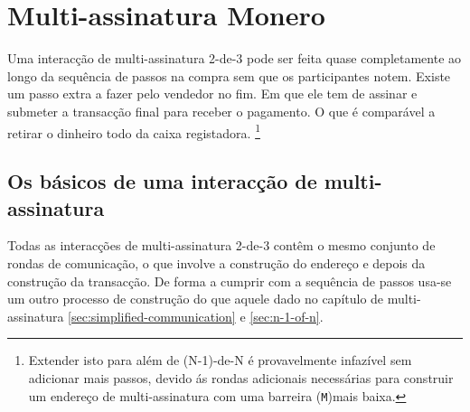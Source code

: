 \section{Multi-assinatura Monero}
\label{sec:escrowed-marketplace-seamless-multisig}

Uma interacção de multi-assinatura 2-de-3 pode ser feita quase completamente ao longo da sequência de passos na compra sem que os participantes notem. Existe um passo extra a fazer pelo vendedor no fim. Em que ele tem de assinar e submeter a transacção final para receber o pagamento. O que é comparável a retirar o dinheiro todo da caixa registadora.  
\footnote{Extender isto para além de (N-1)-de-N é provavelmente infazível sem adicionar mais passos, devido ás rondas adicionais necessárias para construir um endereço de multi-assinatura com uma barreira ({\tt M})mais baixa.}


\subsection{Os básicos de uma interacção de multi-assinatura}
\label{subsec:escrowed-marketplace-multisig-interaction-basics}

Todas as interacções de multi-assinatura 2-de-3 contêm o mesmo conjunto de rondas de comunicação, o que involve a construção do endereço e depois da construção da transacção. De forma a cumprir com a sequência de passos usa-se um outro processo de construção do que aquele dado no capítulo de multi-assinatura \ref{sec:simplified-communication} e \ref{sec:n-1-of-n}. 

